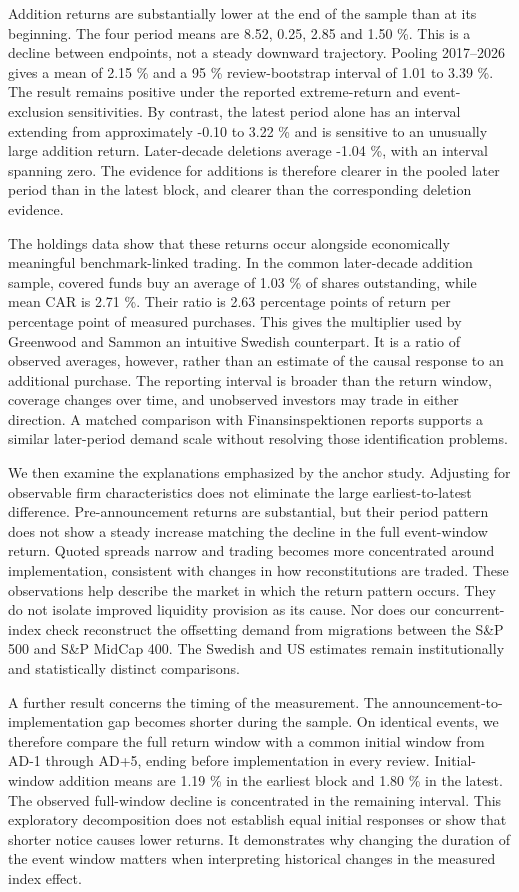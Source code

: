 Addition returns are substantially lower at the end of the sample than at its beginning. The four period means are 8.52, 0.25, 2.85 and 1.50 \%. This is a decline between endpoints, not a steady downward trajectory. Pooling 2017--2026 gives a mean of 2.15 \% and a 95 \% review-bootstrap interval of 1.01 to 3.39 \%. The result remains positive under the reported extreme-return and event-exclusion sensitivities. By contrast, the latest period alone has an interval extending from approximately -0.10 to 3.22 \% and is sensitive to an unusually large addition return. Later-decade deletions average -1.04 \%, with an interval spanning zero. The evidence for additions is therefore clearer in the pooled later period than in the latest block, and clearer than the corresponding deletion evidence.

The holdings data show that these returns occur alongside economically meaningful benchmark-linked trading. In the common later-decade addition sample, covered funds buy an average of 1.03 \% of shares outstanding, while mean CAR is 2.71 \%. Their ratio is 2.63 percentage points of return per percentage point of measured purchases. This gives the multiplier used by Greenwood and Sammon an intuitive Swedish counterpart. It is a ratio of observed averages, however, rather than an estimate of the causal response to an additional purchase. The reporting interval is broader than the return window, coverage changes over time, and unobserved investors may trade in either direction. A matched comparison with Finansinspektionen reports supports a similar later-period demand scale without resolving those identification problems.

We then examine the explanations emphasized by the anchor study. Adjusting for observable firm characteristics does not eliminate the large earliest-to-latest difference. Pre-announcement returns are substantial, but their period pattern does not show a steady increase matching the decline in the full event-window return. Quoted spreads narrow and trading becomes more concentrated around implementation, consistent with changes in how reconstitutions are traded. These observations help describe the market in which the return pattern occurs. They do not isolate improved liquidity provision as its cause. Nor does our concurrent-index check reconstruct the offsetting demand from migrations between the S\&P 500 and S\&P MidCap 400. The Swedish and US estimates remain institutionally and statistically distinct comparisons.

A further result concerns the timing of the measurement. The announcement-to-implementation gap becomes shorter during the sample. On identical events, we therefore compare the full return window with a common initial window from AD-1 through AD+5, ending before implementation in every review. Initial-window addition means are 1.19 \% in the earliest block and 1.80 \% in the latest. The observed full-window decline is concentrated in the remaining interval. This exploratory decomposition does not establish equal initial responses or show that shorter notice causes lower returns. It demonstrates why changing the duration of the event window matters when interpreting historical changes in the measured index effect.

